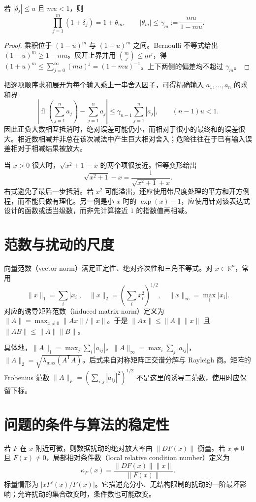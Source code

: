 \documentclass[UTF8,12pt,a4paper,fontset=fandol]{ctexbook}
\begin{document}
\begin{proposition}[连乘的误差合并]
若 $|\delta_j|\le u$ 且 $mu<1$，则
\[
 \prod_{j=1}^{m}(1+\delta_j)=1+\theta_m,
 \qquad |\theta_m|\le\gamma_m:=\frac{mu}{1-mu}.
\]
\end{proposition}
\begin{proof}
乘积位于 $(1-u)^m$ 与 $(1+u)^m$ 之间。Bernoulli 不等式给出 $(1-u)^m\ge1-mu$。展开上界并用 $\binom mj\le m^j$，得 $(1+u)^m\le\sum_{j=0}^\infty(mu)^j=(1-mu)^{-1}$。上下两侧的偏差均不超过 $\gamma_m$。
\end{proof}

把逐项顺序求和展开为每个输入乘上一串舍入因子，可得精确输入 $a_1,\ldots,a_n$ 的求和界
\[
 |\operatorname{fl}(\textstyle\sum_{j=1}^n a_j)-\sum_{j=1}^n a_j|
 \le\gamma_{n-1}\sum_{j=1}^n|a_j|,
 \qquad (n-1)u<1.
\]
因此正负大数相互抵消时，绝对误差可能仍小，而相对于很小的最终和的误差很大。相近数相减并非总在该次减法中产生巨大相对舍入；危险往往在于已有输入误差相对于相减结果被放大。

\begin{example}[等价公式的不同计算效果]
当 $x>0$ 很大时，$\sqrt{x^2+1}-x$ 的两个项很接近。恒等变形给出
\[
 \sqrt{x^2+1}-x=\frac1{\sqrt{x^2+1}+x}.
\]
右式避免了最后一步抵消。若 $x^2$ 可能溢出，还应使用带尺度处理的平方和开方例程，而不能只做有理化。另一例是小 $x$ 时的 $\exp(x)-1$，应使用针对该表达式设计的函数或适当级数，而非先计算接近 $1$ 的指数值再相减。
\end{example}

\section{范数与扰动的尺度}
\label{sec:na-norms}
\begin{definition}[向量范数与诱导矩阵范数]
向量范数（vector norm）满足正定性、绝对齐次性和三角不等式。对 $x\in\mathbb R^n$，常用
\[
 \|x\|_1=\sum_i|x_i|,\quad
 \|x\|_2=(\sum_i x_i^2)^{1/2},\quad
 \|x\|_\infty=\max_i|x_i|.
\]
对应的诱导矩阵范数（induced matrix norm）定义为 $\|A\|=\max_{x\ne0}\|Ax\|/\|x\|$。于是 $\|Ax\|\le\|A\|\|x\|$ 且 $\|AB\|\le\|A\|\|B\|$。
\end{definition}
具体地，$\|A\|_1=\max_j\sum_i|a_{ij}|$，$\|A\|_\infty=\max_i\sum_j|a_{ij}|$，$\|A\|_2=\sqrt{\lambda_{\max}(A^{\mathsf T}A)}$。后式来自对称矩阵正交谱分解与 Rayleigh 商。矩阵的 Frobenius 范数 $\|A\|_F=(\sum_{i,j}|a_{ij}|^2)^{1/2}$ 不是这里的诱导二范数，使用时应保留下标。

\section{问题的条件与算法的稳定性}
\label{sec:na-conditioning}
\begin{definition}[局部条件数]
若 $F$ 在 $x$ 附近可微，则数据扰动的绝对放大率由 $\|DF(x)\|$ 衡量。若 $x\ne0$ 且 $F(x)\ne0$，局部相对条件数（local relative condition number）定义为
\[
 \kappa_F(x)=\frac{\|DF(x)\|\|x\|}{\|F(x)\|}.
\]
标量情形为 $|xF'(x)/F(x)|$。它描述充分小、无结构限制的扰动的一阶最坏影响；允许扰动的集合改变时，条件数也可能改变。
\end{definition}
\end{document}
